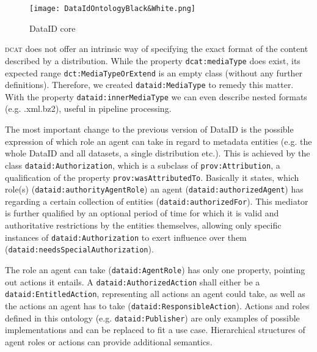 \documentclass[runningheads,a4paper]{llncs}
\newcommand{\dcat}{{\scshape dcat}\xspace}
\newcommand{\prop}[1]{{{\texttt{#1}}}}
\begin{document}
\begin{figure}
\centering
  \texttt{[image: DataIdOntologyBlack\&White.png]}
  \caption{DataID core}
  \label{fig:core}
  \vspace{-1.5em}
\end{figure}

\dcat does not offer an intrinsic way of specifying the exact format of the content described by a distribution. While the property \prop{dcat:mediaType} does exist, its expected range \prop{dct:MediaTypeOrExtend} is an empty class (without any further definitions).
Therefore, we created \prop{dataid:MediaType} to remedy this matter. With the property \prop{dataid:innerMediaType} we can even describe nested formats (e.g. .xml.bz2), useful in pipeline processing.

The most important change to the previous version of DataID is the possible expression of which role an agent can take in regard to metadata entities (e.g. the whole DataID and all datasets, a single distribution etc.).
This is achieved by the class \prop{dataid:Authorization}, which is a subclass of \prop{prov:Attribution}, a qualification of the property \prop{prov:wasAttributedTo}. Basically it states, which role(s) (\prop{dataid:authorityAgentRole}) an agent (\prop{dataid:authorizedAgent}) has regarding a certain collection of entities (\prop{dataid:authorizedFor}). This mediator is further qualified by an optional period of time for which it is valid and authoritative restrictions by the entities themselves, allowing only specific instances of \prop{dataid:Authorization} to exert influence over them (\prop{dataid:needsSpecialAuthorization}).


The role an agent can take (\prop{dataid:AgentRole}) has only one property, pointing out actions it entails. A \prop{dataid:AuthorizedAction} shall either be a \prop{dataid:EntitledAction}, representing all actions an agent could take, as well as the actions an agent has to take (\prop{dataid:ResponsibleAction}). Actions and roles defined in this ontology (e.g. \prop{dataid:Publisher}) are only examples of possible implementations and can be replaced to fit a use case.
Hierarchical structures of agent roles or actions can provide additional semantics.
\end{document}
